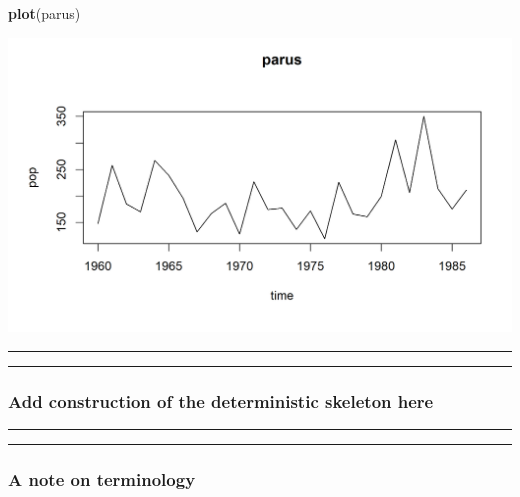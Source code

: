 \documentclass[]{article}
\newenvironment{Shaded}{\begin{snugshade}}{\end{snugshade}}
\newcommand{\KeywordTok}[1]{\textcolor[rgb]{0.13,0.29,0.53}{\textbf{#1}}}
\newcommand{\NormalTok}[1]{#1}
\begin{document}
\begin{Shaded}
\begin{Highlighting}[]
\KeywordTok{plot}\NormalTok{(parus)}
\end{Highlighting}
\end{Shaded}

\begin{center}\includegraphics{figure/intro-parus-plot1-1} \end{center}

\begin{center}\rule{0.5\linewidth}{\linethickness}\end{center}

\begin{center}\rule{0.5\linewidth}{\linethickness}\end{center}

\subsubsection{Add construction of the deterministic skeleton
here}\label{add-construction-of-the-deterministic-skeleton-here}

\begin{center}\rule{0.5\linewidth}{\linethickness}\end{center}

\begin{center}\rule{0.5\linewidth}{\linethickness}\end{center}

\subsubsection{A note on terminology}\label{a-note-on-terminology}
\end{document}
